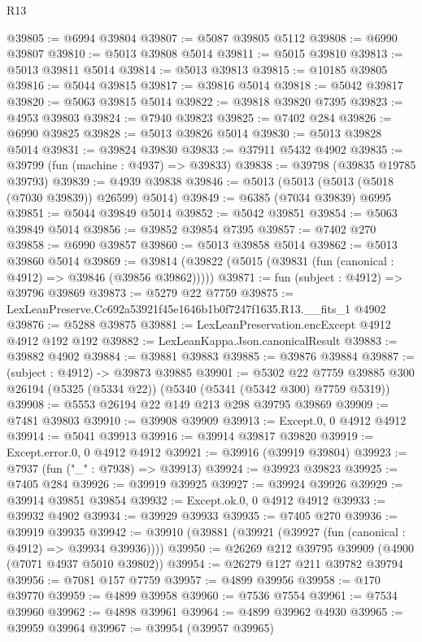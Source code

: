 \begin{lexlean}{R13}
\begin{coremodule}
@39805 := @6994 @39804
@39807 := @5087 @39805 @5112
@39808 := @6990 @39807
@39810 := @5013 @39808 @5014
@39811 := @5015 @39810
@39813 := @5013 @39811 @5014
@39814 := @5013 @39813
@39815 := @10185 @39805
@39816 := @5044 @39815
@39817 := @39816 @5014
@39818 := @5042 @39817
@39820 := @5063 @39815 @5014
@39822 := @39818 @39820 @7395
@39823 := @4953 @39803
@39824 := @7940 @39823
@39825 := @7402 @284
@39826 := @6990 @39825
@39828 := @5013 @39826 @5014
@39830 := @5013 @39828 @5014
@39831 := @39824 @39830
@39833 := @37911 @5432 @4902
@39835 := @39799 (fun (machine : @4937) => @39833)
@39838 := @39798 (@39835 @19785 @39793)
@39839 := @4939 @39838
@39846 := @5013 (@5013 (@5013 (@5018 (@7030 @39839)) @26599) @5014)
@39849 := @6385 (@7034 @39839) @6995
@39851 := @5044 @39849 @5014
@39852 := @5042 @39851
@39854 := @5063 @39849 @5014
@39856 := @39852 @39854 @7395
@39857 := @7402 @270
@39858 := @6990 @39857
@39860 := @5013 @39858 @5014
@39862 := @5013 @39860 @5014
@39869 := @39814 (@39822 (@5015 (@39831 (fun (canonical : @4912) => @39846 (@39856 @39862)))))
@39871 := fun (subject : @4912) => @39796 @39869
@39873 := @5279 @22 @7759
@39875 := LexLeanPreserve.Cc692a53921f45e1646b1b0f7247f1635.R13.__fits_1 @4902
@39876 := @5288 @39875
@39881 := LexLeanPreservation.encExcept @4912 @4912 @192 @192
@39882 := LexLeanKappa.Json.canonicalResult
@39883 := @39882 @4902
@39884 := @39881 @39883
@39885 := @39876 @39884
@39887 := (subject : @4912) -> @39873 @39885
@39901 := @5302
    @22
    @7759
    @39885
    @300
    @26194
    (@5325 (@5334 @22))
    (@5340 (@5341 (@5342 @300) @7759 @5319))
@39908 := @5553 @26194 @22 @149 @213 @298 @39795 @39869
@39909 := @7481 @39803
@39910 := @39908 @39909
@39913 := Except.{0, 0} @4912 @4912
@39914 := @5041 @39913
@39916 := @39914 @39817 @39820
@39919 := Except.error.{0, 0} @4912 @4912
@39921 := @39916 (@39919 @39804)
@39923 := @7937 (fun ("_" : @7938) => @39913)
@39924 := @39923 @39823
@39925 := @7405 @284
@39926 := @39919 @39925
@39927 := @39924 @39926
@39929 := @39914 @39851 @39854
@39932 := Except.ok.{0, 0} @4912 @4912
@39933 := @39932 @4902
@39934 := @39929 @39933
@39935 := @7405 @270
@39936 := @39919 @39935
@39942 := @39910 (@39881 (@39921 (@39927 (fun (canonical : @4912) => @39934 @39936))))
@39950 := @26269 @212 @39795 @39909 (@4900 (@7071 @4937 @5010 @39802))
@39954 := @26279 @127 @211 @39782 @39794
@39956 := @7081 @157 @7759
@39957 := @4899 @39956
@39958 := @170 @39770
@39959 := @4899 @39958
@39960 := @7536 @7554
@39961 := @7534 @39960
@39962 := @4898 @39961
@39964 := @4899 @39962 @4930
@39965 := @39959 @39964
@39967 := @39954 (@39957 @39965)

\end{coremodule}
\end{lexlean}
